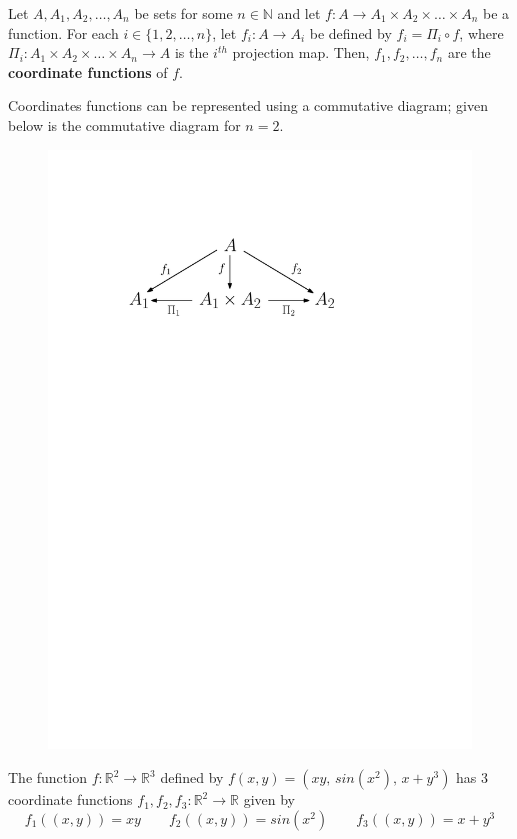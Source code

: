 \documentclass[a4paper,english,12pt]{article}
\begin{document}
\begin{defn} Let $A,A_1,A_2,\ldots,A_n$ be sets for some $n\in \mathbb{N}$ and let $f:A\rightarrow A_1\times A_2\times \ldots \times A_n$ be a function. For each $i\in \{1,2,\ldots ,n\}$, let $f_i:A\rightarrow A_i$ be defined by $f_i=\Pi _i\circ f$, where $\Pi _i:A_1\times A_2\times \ldots \times A_n \rightarrow A$ is the $i^{th}$ projection map. Then, $f_1,f_2,\ldots ,f_n$ are the \textbf{coordinate functions} of $f$.
\end{defn}
Coordinates functions can be represented using a commutative diagram; given below is the commutative diagram for $n=2$.
\begin{figure}[h]
\centering
\includegraphics[scale=0.56]{Figures/l5f4_coord.pdf}
\end{figure}

\begin{exmp}
The function $f:\mathbb{R}^2\rightarrow \mathbb{R}^3$ defined by $f(x,y)=(xy,\,sin(x^2),\,x+y^3)$ has 3 coordinate functions $f_1,f_2,f_3:\mathbb{R}^2\rightarrow \mathbb{R}$ given by 
\begin{equation*}
f_1((x,y))=xy \qquad f_2((x,y))=sin(x^2) \qquad f_3((x,y))=x+y^3
\end{equation*}
\end{exmp}
\end{document}
